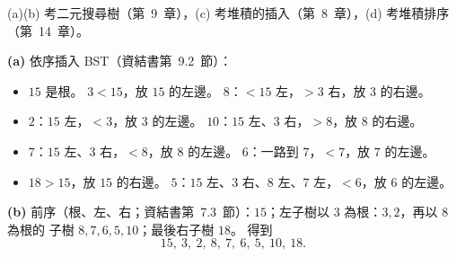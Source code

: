 \begin{pastsoln}
(a)(b) 考二元搜尋樹（第~9~章），(c) 考堆積的插入（第~8~章），(d) 考堆積排序（第~14~章）。

\textbf{(a)} 依序插入 BST（資結書第~9.2~節）：
\begin{itemize}
\item $15$ 是根。 $3 < 15$，放 $15$ 的左邊。 $8$：$< 15$ 左，$> 3$ 右，放 $3$ 的右邊。
\item $2$：$15$ 左，$< 3$，放 $3$ 的左邊。 $10$：$15$ 左、$3$ 右，$> 8$，放 $8$ 的右邊。
\item $7$：$15$ 左、$3$ 右，$< 8$，放 $8$ 的左邊。 $6$：一路到 $7$，$< 7$，放 $7$ 的左邊。
\item $18 > 15$，放 $15$ 的右邊。 $5$：$15$ 左、$3$ 右、$8$ 左、$7$ 左，$< 6$，放 $6$ 的左邊。
\end{itemize}
\begin{center}
\end{center}

\textbf{(b)} 前序（根、左、右；資結書第~7.3~節）：$15$；左子樹以 $3$ 為根：$3, 2$，再以 $8$ 為根的
子樹 $8, 7, 6, 5, 10$；最後右子樹 $18$。 得到
\[
15,\ 3,\ 2,\ 8,\ 7,\ 6,\ 5,\ 10,\ 18.
\]


\end{pastsoln}
